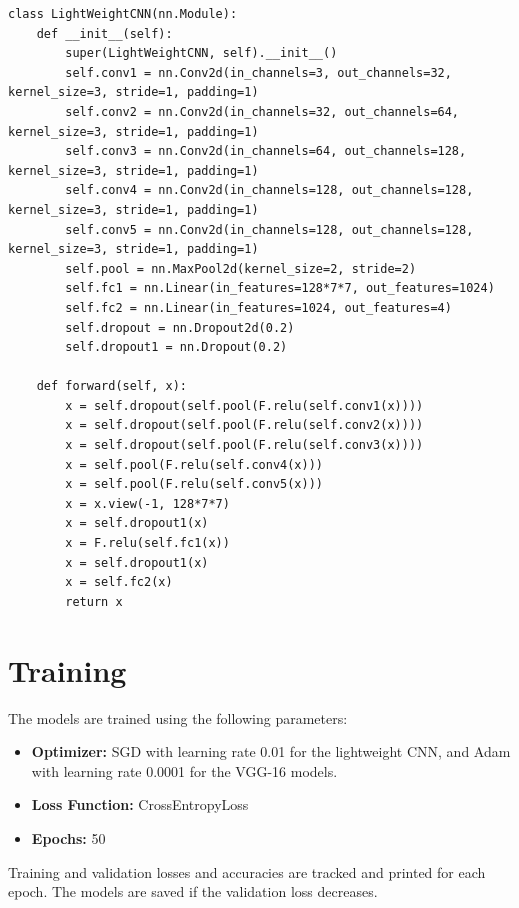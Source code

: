 \begin{verbatim}
class LightWeightCNN(nn.Module):
    def __init__(self):
        super(LightWeightCNN, self).__init__()
        self.conv1 = nn.Conv2d(in_channels=3, out_channels=32, kernel_size=3, stride=1, padding=1)
        self.conv2 = nn.Conv2d(in_channels=32, out_channels=64, kernel_size=3, stride=1, padding=1)
        self.conv3 = nn.Conv2d(in_channels=64, out_channels=128, kernel_size=3, stride=1, padding=1)
        self.conv4 = nn.Conv2d(in_channels=128, out_channels=128, kernel_size=3, stride=1, padding=1)
        self.conv5 = nn.Conv2d(in_channels=128, out_channels=128, kernel_size=3, stride=1, padding=1)
        self.pool = nn.MaxPool2d(kernel_size=2, stride=2)
        self.fc1 = nn.Linear(in_features=128*7*7, out_features=1024)
        self.fc2 = nn.Linear(in_features=1024, out_features=4)
        self.dropout = nn.Dropout2d(0.2)
        self.dropout1 = nn.Dropout(0.2)

    def forward(self, x):
        x = self.dropout(self.pool(F.relu(self.conv1(x))))
        x = self.dropout(self.pool(F.relu(self.conv2(x))))
        x = self.dropout(self.pool(F.relu(self.conv3(x))))
        x = self.pool(F.relu(self.conv4(x)))
        x = self.pool(F.relu(self.conv5(x)))
        x = x.view(-1, 128*7*7)
        x = self.dropout1(x)
        x = F.relu(self.fc1(x))
        x = self.dropout1(x)
        x = self.fc2(x)
        return x
\end{verbatim}

\section{Training}

The models are trained using the following parameters:

\begin{itemize}
    \item \textbf{Optimizer:} SGD with learning rate 0.01 for the lightweight CNN, and Adam with learning rate 0.0001 for the VGG-16 models.
    \item \textbf{Loss Function:} CrossEntropyLoss
    \item \textbf{Epochs:} 50
\end{itemize}

Training and validation losses and accuracies are tracked and printed for each epoch. The models are saved if the validation loss decreases.
